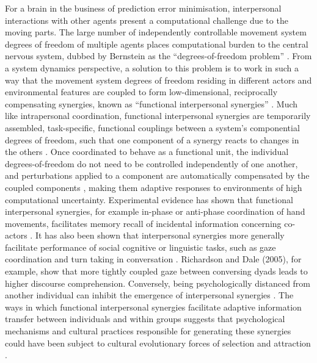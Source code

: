 \begin{CJK}{UTF8}{gbsn}
{For a brain in the business of prediction error minimisation, interpersonal interactions with other agents present a computational challenge due to the moving parts.  The large number of independently controllable movement system degrees of freedom of multiple agents places computational burden to the central nervous system, dubbed by Bernstein \textcite{Bernstein1967} as the ``degrees-of-freedom problem'' \citep[see also][]{Turvey1982,Turvey1990}.  From a system dynamics perspective, a solution to this problem is to work in such a way that the movement system degrees of freedom residing in different actors and environmental features are coupled to form low-dimensional, reciprocally compensating synergies, known as ``functional interpersonal synergies'' \citep{Riley2011}.
Much like intrapersonal coordination, functional interpersonal synergies are temporarily assembled, task-specific, functional couplings between a system's componential degrees of freedom, such that one component of a synergy reacts to changes in the others \citep{Kelso2009}.  Once coordinated to behave as a functional unit, the individual degrees-of-freedom do not need to be controlled independently of one another, and perturbations applied to a component are automatically compensated by the coupled components \citep{Kelso1984,Latash2002,Riley2011}, making them adaptive responses to environments of high computational uncertainty.
Experimental evidence has shown that functional interpersonal synergies, for example in-phase or anti-phase coordination of hand movements, facilitates memory recall of incidental information concerning co-actors \citep{Miles2010}. It has also been shown that interpersonal synergies more generally facilitate performance of social cognitive or linguistic tasks, such as gaze coordination and turn taking in conversation \citep{Richardson2005,Shockley2009}.  Richardson and Dale (2005), for example, show that more tightly coupled gaze between conversing dyads leads to higher discourse comprehension.  Conversely, being psychologically distanced from another individual can inhibit the emergence of interpersonal synergies \citep{Miles2010}.  The ways in which functional interpersonal synergies facilitate adaptive information transfer between individuals and within groups suggests that psychological mechanisms and cultural practices responsible for generating these synergies could have been subject to cultural evolutionary forces of selection and attraction \citep{Claidiere2014,Mesoudi2016a}.

}
\end{CJK}
